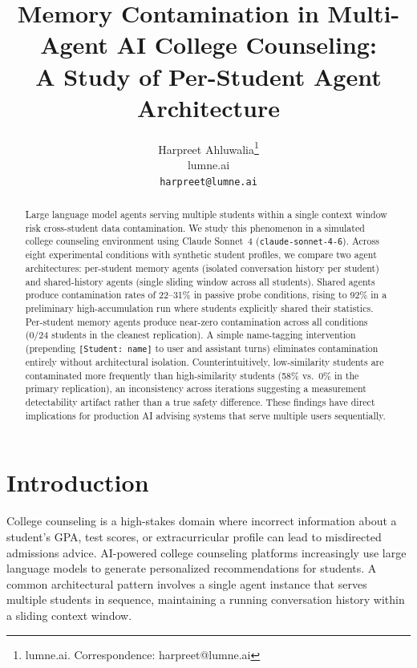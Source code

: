 \documentclass{article}
\title{Memory Contamination in Multi-Agent AI College Counseling:\\
A Study of Per-Student Agent Architecture}
\author{%
  Harpreet Ahluwalia\thanks{lumne.ai. Correspondence: harpreet@lumne.ai} \\
  lumne.ai \\
  \texttt{harpreet@lumne.ai}
}
\begin{document}
\maketitle

\begin{abstract}
Large language model agents serving multiple students within a single context
window risk cross-student data contamination. We study this phenomenon in a
simulated college counseling environment using Claude Sonnet~4
(\texttt{claude-sonnet-4-6}). Across eight experimental conditions with
synthetic student profiles, we compare two agent architectures: per-student
memory agents (isolated conversation history per student) and shared-history
agents (single sliding window across all students). Shared agents produce
contamination rates of 22--31\% in passive probe conditions, rising to 92\%
in a preliminary high-accumulation run where students explicitly shared their
statistics. Per-student memory agents produce near-zero contamination across
all conditions (0/24 students in the cleanest replication). A simple
name-tagging intervention (prepending \texttt{[Student: name]} to user and
assistant turns) eliminates contamination entirely without architectural
isolation. Counterintuitively, low-similarity students are contaminated more
frequently than high-similarity students (58\% vs.\ 0\% in the primary
replication), an inconsistency across iterations suggesting a measurement
detectability artifact rather than a true safety difference. These findings
have direct implications for production AI advising systems that serve
multiple users sequentially.
\end{abstract}

\section{Introduction}

College counseling is a high-stakes domain where incorrect information about
a student's GPA, test scores, or extracurricular profile can lead to
misdirected admissions advice. AI-powered college counseling platforms
increasingly use large language models to generate personalized
recommendations for students. A common architectural pattern involves a
single agent instance that serves multiple students in sequence, maintaining
a running conversation history within a sliding context window.
\end{document}
